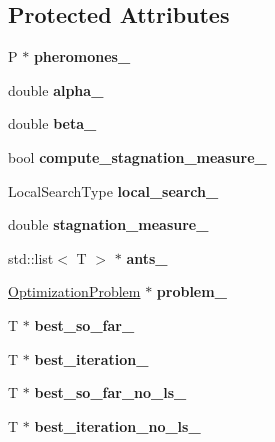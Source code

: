 \subsection*{Protected Attributes}
\begin{CompactItemize}
\item 
\hypertarget{classAntColony_8caa008736aa07ffd2b7125407126db8}{
P $\ast$ \textbf{pheromones\_\-}}
\label{classAntColony_8caa008736aa07ffd2b7125407126db8}

\item 
\hypertarget{classAntColony_790f9f0d9d6f452bb9b92d6eef86db10}{
double \textbf{alpha\_\-}}
\label{classAntColony_790f9f0d9d6f452bb9b92d6eef86db10}

\item 
\hypertarget{classAntColony_ff9c86f0fcbc70960925ad6bdda32f0d}{
double \textbf{beta\_\-}}
\label{classAntColony_ff9c86f0fcbc70960925ad6bdda32f0d}

\item 
\hypertarget{classAntColony_06fe6c9f0196c12047f2a4e00dce765d}{
bool \textbf{compute\_\-stagnation\_\-measure\_\-}}
\label{classAntColony_06fe6c9f0196c12047f2a4e00dce765d}

\item 
\hypertarget{classAntColony_9f9429937c3625fc96a4920e18a1af52}{
LocalSearchType \textbf{local\_\-search\_\-}}
\label{classAntColony_9f9429937c3625fc96a4920e18a1af52}

\item 
\hypertarget{classAntColony_79a6dfde49b76bc3e74e7eacdfea5d66}{
double \textbf{stagnation\_\-measure\_\-}}
\label{classAntColony_79a6dfde49b76bc3e74e7eacdfea5d66}

\item 
\hypertarget{classAntColony_a2fe90465f65ef4ed374ed2c58049d9a}{
std::list$<$ T $>$ $\ast$ \textbf{ants\_\-}}
\label{classAntColony_a2fe90465f65ef4ed374ed2c58049d9a}

\item 
\hypertarget{classAntColony_c4290e064a01d849c700e527f7d81486}{
\hyperlink{classOptimizationProblem}{OptimizationProblem} $\ast$ \textbf{problem\_\-}}
\label{classAntColony_c4290e064a01d849c700e527f7d81486}

\item 
\hypertarget{classAntColony_27995e86165cb9742696427119ebe8d5}{
T $\ast$ \textbf{best\_\-so\_\-far\_\-}}
\label{classAntColony_27995e86165cb9742696427119ebe8d5}

\item 
\hypertarget{classAntColony_ac25a206baa571dd8c968cff992140cb}{
T $\ast$ \textbf{best\_\-iteration\_\-}}
\label{classAntColony_ac25a206baa571dd8c968cff992140cb}

\item 
\hypertarget{classAntColony_1e547e925018a29ef40a7dfe9bdf006e}{
T $\ast$ \textbf{best\_\-so\_\-far\_\-no\_\-ls\_\-}}
\label{classAntColony_1e547e925018a29ef40a7dfe9bdf006e}

\item 
\hypertarget{classAntColony_d396db834ac786f77e42fbc7f87b197c}{
T $\ast$ \textbf{best\_\-iteration\_\-no\_\-ls\_\-}}
\label{classAntColony_d396db834ac786f77e42fbc7f87b197c}

\end{CompactItemize}


